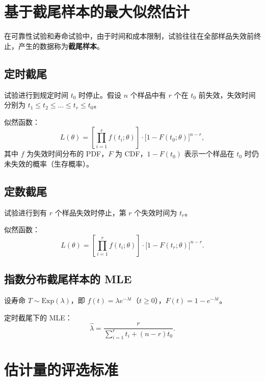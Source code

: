 \section{基于截尾样本的最大似然估计}

在可靠性试验和寿命试验中，由于时间和成本限制，试验往往在全部样品失效前终止，产生的数据称为\textbf{截尾样本}。

\subsection{定时截尾}

试验进行到规定时间 $t_0$ 时停止。假设 $n$ 个样品中有 $r$ 个在 $t_0$ 前失效，失效时间分别为 $t_1 \le t_2 \le \dots \le t_r \le t_0$。

似然函数：
\begin{equation}
    L(\theta) = \left[\prod_{i=1}^{r} f(t_i; \theta)\right] \cdot \big[1 - F(t_0; \theta)\big]^{n-r},
\end{equation}
其中 $f$ 为失效时间分布的 PDF，$F$ 为 CDF，$1-F(t_0)$ 表示一个样品在 $t_0$ 时仍未失效的概率（生存概率）。

\subsection{定数截尾}

试验进行到有 $r$ 个样品失效时停止，第 $r$ 个失效时间为 $t_r$。

似然函数：
\begin{equation}
    L(\theta) = \left[\prod_{i=1}^{r} f(t_i; \theta)\right] \cdot \big[1 - F(t_r; \theta)\big]^{n-r}.
\end{equation}

\subsection{指数分布截尾样本的 MLE}

设寿命 $T \sim \mathrm{Exp}(\lambda)$，即 $f(t) = \lambda e^{-\lambda t}$（$t \ge 0$），$F(t) = 1 - e^{-\lambda t}$。

定时截尾下的 MLE：
\begin{equation}
    \hat{\lambda} = \frac{r}{\sum_{i=1}^{r} t_i + (n-r)t_0}.
\end{equation}

\section{估计量的评选标准}

